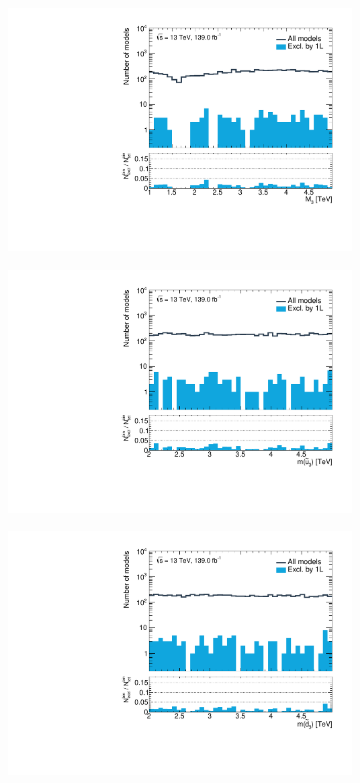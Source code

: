 \begin{figure}
\begin{subfigure}[b]{0.4\linewidth}
	\end{subfigure}
	\begin{subfigure}[b]{0.4\linewidth}
		\centering\includegraphics[width=\textwidth]{1D/M3}
	\end{subfigure}
	\begin{subfigure}[b]{0.4\linewidth}
		\centering\includegraphics[width=\textwidth]{1D/mtR}
	\end{subfigure}
	\begin{subfigure}[b]{0.4\linewidth}
		\centering\includegraphics[width=\textwidth]{1D/mbR}

\end{subfigure}
\end{figure}
